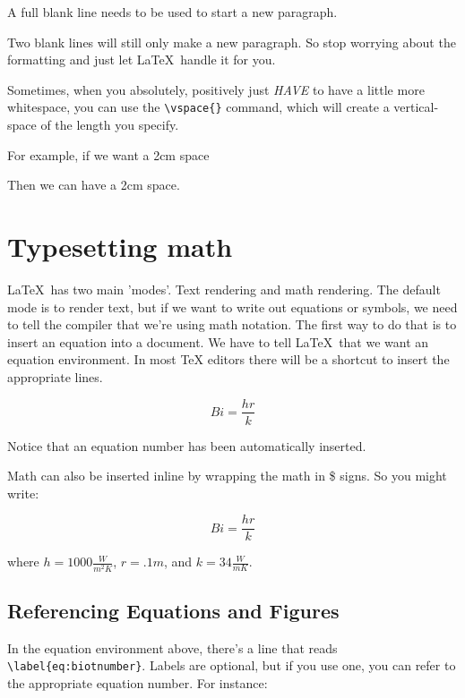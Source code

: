\documentclass[12pt,a4paper]{article}
\begin{document}
  A full blank line needs to be used to start a new paragraph.  


  Two blank lines will still only make a new paragraph. So stop worrying
  about the formatting and just let \LaTeX\ handle it for you.  

  Sometimes, when you absolutely, positively just \textit{HAVE} to have
  a little more whitespace, you can use the \verb|\vspace{}| command,
  which will create a vertical-space of the length you specify.  

  For example, if we want a 2cm space

  \vspace{2cm}
 
  Then we can have a 2cm space.

\section{Typesetting math}
  \LaTeX\ has two main 'modes'.  Text
  rendering and math rendering.  The default mode is to render text, but
  if we want to write out equations or symbols, we need to tell the
  compiler that we're using math notation.  The first way to do that is
  to insert an equation into a document.
  We have to tell \LaTeX\ that we want an equation environment.  In most
  TeX editors there will be a shortcut to insert the appropriate
  lines.  

  \begin{equation}
    Bi = \frac{hr}{k}
    \label{eq:biotnumber}
  \end{equation}

  Notice that an equation number has been automatically inserted. 

  Math can also be inserted inline by wrapping the math in \$ signs. So
  you might write: 

  \begin{equation}
    Bi = \frac{hr}{k}
    \label{eq:biotnumber2}
  \end{equation}

  where $h = 1000 \frac{W}{m^2K}$, $r = .1m$, and $k = 34 \frac{W}{m
  K}$.
  
  \subsection{Referencing Equations and Figures}
  In the equation environment above, there's a line that reads
  \verb|\label{eq:biotnumber}|.  Labels are optional, but if you use
  one, you can refer to the appropriate equation number.  For instance:
  
\end{document}
